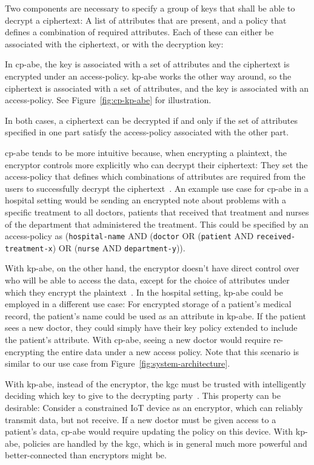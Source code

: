 Two components are necessary to specify a group of keys that shall be able to decrypt a ciphertext:
A list of attributes that are present, and a policy that defines a combination of required attributes. 
Each of these can either be associated with the ciphertext, or with the decryption key:

In \acrfull{cp-abe}, the key is associated with a set of attributes and the ciphertext is encrypted under an \gls{access-policy}.
\acrfull{kp-abe} works the other way around, so the ciphertext is associated with a set of attributes, and the key is associated with an \gls{access-policy}.
See Figure~\ref{fig:cp-kp-abe} for illustration.

In both cases, a ciphertext can be decrypted if and only if the set of attributes specified in one part satisfy the \gls{access-policy} associated with the other part.

\acrshort{cp-abe} tends to be more intuitive because, when encrypting a plaintext, the encryptor controls more explicitly who can decrypt their ciphertext:
They set the \gls{access-policy} that defines which combinations of attributes are required from the users to successfully decrypt the ciphertext~\cite{bethencourt_ciphertext-policy_2007}.
An example use case for \acrshort{cp-abe} in a hospital setting would be sending an encrypted note about problems with a specific treatment to all doctors, patients that received that treatment and nurses of the department that administered the treatment.
This could be specified by an \gls{access-policy} as (\texttt{hospital-name} AND (\texttt{doctor} OR (\texttt{patient} AND \texttt{received-treatment-x}) OR (\texttt{nurse} AND \texttt{department-y})).

With \acrshort{kp-abe}, on the other hand, the encryptor doesn't have direct control over who will be able to access the data, except for the choice of attributes under which they encrypt the plaintext~\cite{bethencourt_ciphertext-policy_2007}.
In the hospital setting, \acrshort{kp-abe} could be employed in a different use case: For encrypted storage of a patient's medical record, the patient's name could be used as an attribute in \acrshort{kp-abe}.
If the patient sees a new doctor, they could simply have their key policy extended to include the patient's attribute.
With \acrshort{cp-abe}, seeing a new doctor would require re-encrypting the entire data under a new access policy.
Note that this scenario is similar to our use case from Figure~\ref{fig:system-architecture}.

With \acrshort{kp-abe}, instead of the encryptor, the \acrlong{kgc} must be trusted with intelligently deciding which key to give to the decrypting party~\cite{bethencourt_ciphertext-policy_2007}.
This property can be desirable: Consider a constrained IoT device as an encryptor, which can reliably transmit data, but not receive.
If a new doctor must be given access to a patient's data, \acrshort{cp-abe} would require updating the policy on this device.
With \acrshort{kp-abe}, policies are handled by the \acrshort{kgc}, which is in general much more powerful and better-connected than encryptors might be.


